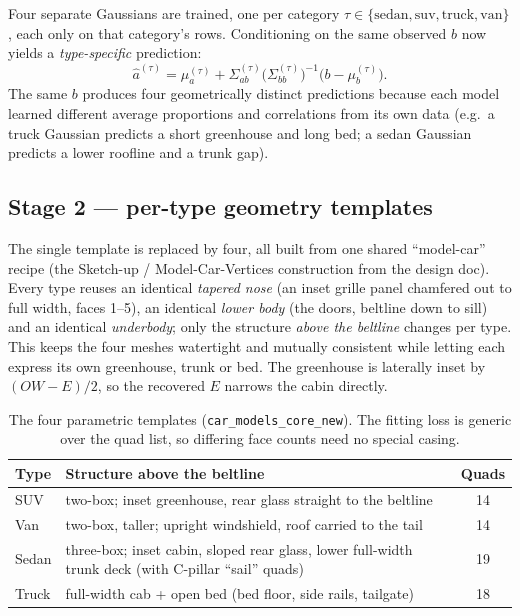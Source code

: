 \documentclass[11pt]{article}
\newcommand{\OW}{\mathit{OW}}
\theoremstyle{definition}
\begin{document}
Four separate Gaussians are trained, one per category $\tau \in \{\text{sedan},\text{suv},\text{truck},\text{van}\}$, each only on that category's rows. Conditioning on the same observed $b$ now yields a \emph{type-specific} prediction:
\begin{equation}
\hat{a}^{(\tau)} = \mu_a^{(\tau)} + \Sigma_{ab}^{(\tau)}\big(\Sigma_{bb}^{(\tau)}\big)^{-1}\!\big(b - \mu_b^{(\tau)}\big).
\label{eq:condtau}
\end{equation}
The same $b$ produces four geometrically distinct predictions because each model learned different average proportions and correlations from its own data (e.g.\ a truck Gaussian predicts a short greenhouse and long bed; a sedan Gaussian predicts a lower roofline and a trunk gap).

\subsection{Stage 2 --- per-type geometry templates}

The single template is replaced by four, all built from one shared ``model-car'' recipe (the Sketch-up / Model-Car-Vertices construction from the design doc). Every type reuses an identical \emph{tapered nose} (an inset grille panel chamfered out to full width, faces 1--5), an identical \emph{lower body} (the doors, beltline down to sill) and an identical \emph{underbody}; only the structure \emph{above the beltline} changes per type. This keeps the four meshes watertight and mutually consistent while letting each express its own greenhouse, trunk or bed. The greenhouse is laterally inset by $(\OW-E)/2$, so the recovered $E$ narrows the cabin directly.

\begin{table}[h]
\centering
\begin{tabular}{p{1.6cm} p{8.3cm} c}
\toprule
\textbf{Type} & \textbf{Structure above the beltline} & \textbf{Quads} \\
\midrule
SUV   & two-box; inset greenhouse, rear glass straight to the beltline & 14 \\
Van   & two-box, taller; upright windshield, roof carried to the tail & 14 \\
Sedan & three-box; inset cabin, sloped rear glass, lower full-width trunk deck (with C-pillar ``sail'' quads) & 19 \\
Truck & full-width cab + open bed (bed floor, side rails, tailgate) & 18 \\
\bottomrule
\end{tabular}
\caption{The four parametric templates (\texttt{car\_models\_core\_new}). The fitting loss is generic over the quad list, so differing face counts need no special casing.}
\end{table}
\end{document}
